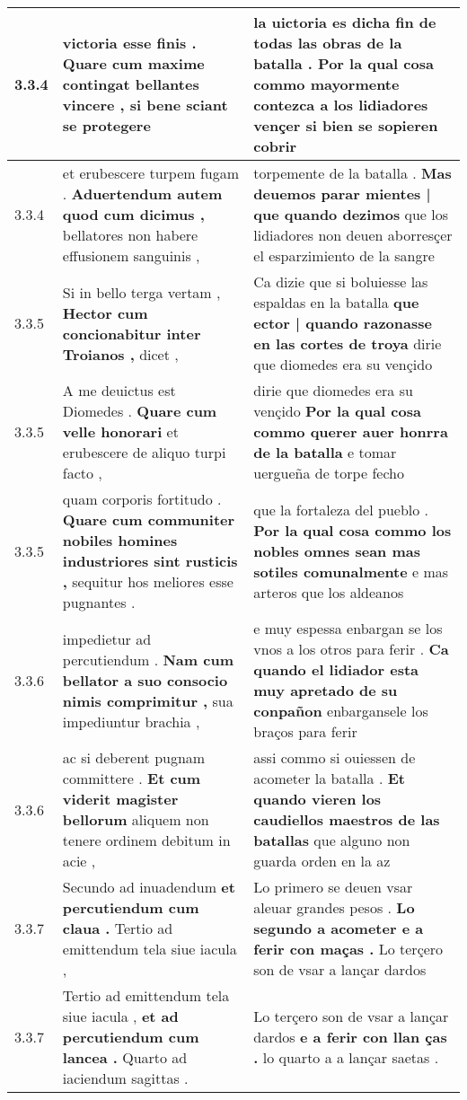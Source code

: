\begin{tabular}{|p{1cm}|p{6.5cm}|p{6.5cm}|}
3.3.4 & victoria esse finis . \textbf{ Quare cum maxime contingat bellantes vincere , } si bene sciant se protegere & la uictoria es dicha fin de todas las obras de la batalla . \textbf{ Por la qual cosa commo mayormente contezca a los lidiadores vençer } si bien se sopieren cobrir \\\hline
3.3.4 & et erubescere turpem fugam . \textbf{ Aduertendum autem quod cum dicimus , } bellatores non habere effusionem sanguinis , & torpemente de la batalla . \textbf{ Mas deuemos parar mientes | que quando dezimos } que los lidiadores non deuen aborresçer el esparzimiento de la sangre \\\hline
3.3.5 & Si in bello terga vertam , \textbf{ Hector cum concionabitur inter Troianos , } dicet , & Ca dizie que si boluiesse las espaldas en la batalla \textbf{ que ector | quando razonasse en las cortes de troya } dirie que diomedes era su vençido \\\hline
3.3.5 & A me deuictus est Diomedes . \textbf{ Quare cum velle honorari } et erubescere de aliquo turpi facto , & dirie que diomedes era su vençido \textbf{ Por la qual cosa commo querer auer honrra de la batalla } e tomar uergueña de torpe fecho \\\hline
3.3.5 & quam corporis fortitudo . \textbf{ Quare cum communiter nobiles homines industriores sint rusticis , } sequitur hos meliores esse pugnantes . & que la fortaleza del pueblo . \textbf{ Por la qual cosa commo los nobles omnes sean mas sotiles comunalmente } e mas arteros que los aldeanos \\\hline
3.3.6 & impedietur ad percutiendum . \textbf{ Nam cum bellator a suo consocio nimis comprimitur , } sua impediuntur brachia , & e muy espessa enbargan se los vnos a los otros para ferir . \textbf{ Ca quando el lidiador esta muy apretado de su conpañon } enbargansele los braços para ferir \\\hline
3.3.6 & ac si deberent pugnam committere . \textbf{ Et cum viderit magister bellorum } aliquem non tenere ordinem debitum in acie , & assi commo si ouiessen de acometer la batalla . \textbf{ Et quando vieren los caudiellos maestros de las batallas } que alguno non guarda orden en la az \\\hline
3.3.7 & Secundo ad inuadendum \textbf{ et percutiendum cum claua . } Tertio ad emittendum tela siue iacula , & Lo primero se deuen vsar aleuar grandes pesos . \textbf{ Lo segundo a acometer e a ferir con maças . } Lo terçero son de vsar a lançar dardos \\\hline
3.3.7 & Tertio ad emittendum tela siue iacula , \textbf{ et ad percutiendum cum lancea . } Quarto ad iaciendum sagittas . & Lo terçero son de vsar a lançar dardos \textbf{ e a ferir con llan ças . } lo quarto a a lançar saetas . \\\hline

\end{tabular}
